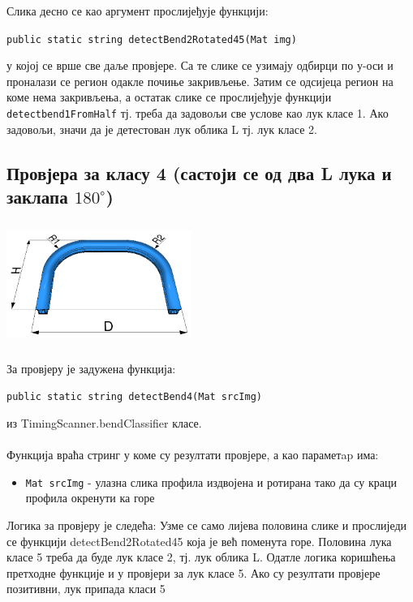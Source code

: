 \documentclass[12pt]{article}
\begin{document}
\vspace{0.5cm}
Слика десно се као аргумент прослијеђује функцији:
\begin{center}
\texttt{public static string detectBend2Rotated45(Mat img)}
\end{center}
у којој се врше све даље провјере. Са те слике се узимају одбирци по у-оси и проналази се регион одакле почиње закривљење. Затим се одсијеца регион на коме нема закривљења, а остатак слике се прослијеђује функцији \texttt{detectbend1FromHalf} тј. треба да задовољи све услове као лук класе 1. Ако задовољи, значи да је детестован лук облика L тј. лук класе 2.


\subsection{Провјера за класу 4 (састоји се од два L лука и заклапа $180^\circ$)}
\vspace{0.5cm}
\begin{center}
    \centering 
    \includegraphics[height=4cm, width=6cm]{images/klasa4.jpg}
\end{center}
\vspace{0.5cm}
За провјеру је задужена функција:
\begin{center}
\texttt{public static string detectBend4(Mat srcImg)}
\end{center}
из TimingScanner.bendClassifier класе.\\\\
Функција враћа стринг у коме су резултати провјере, а као параметap има:
\begin{itemize}
    \item \texttt{Mat srcImg} - улазна слика профила издвојена и ротирана тако да су краци профила окренути ка горе 
\end{itemize}
Логика за провјеру је следећа: Узме се само лијева половина слике и прослиједи се функцији detectBend2Rotated45 која је већ поменута горе. Половина лука класе 5 треба да буде лук класе 2, тј. лук облика L. Одатле логика коришћења претходне функције и у провјери за лук класе 5. Ако су резултати провјере позитивни, лук припада класи 5
\end{document}

